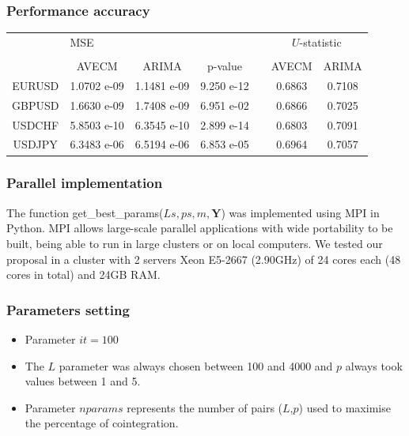 \documentclass[compress,red]{beamer}
\begin{document}
\begin{frame}
\frametitle{Performance accuracy}
\small
\begin{tabular}{ccccccc}
& \multicolumn{3}{l}{MSE} & &
\multicolumn{2}{c}{$U$-statistic} \\ 
\hhline{~---~--} \\
 & AVECM & ARIMA & p-value & &
AVECM & ARIMA \\ 

\hline
 EURUSD & 1.0702 e-09 & 1.1481 e-09 &  9.250 e-12 & & 0.6863 & 0.7108\\
 GBPUSD & 1.6630 e-09 & 1.7408 e-09 &  6.951 e-02 & & 0.6866 & 0.7025\\
 USDCHF & 5.8503 e-10 & 6.3545 e-10 &  2.899 e-14 & & 0.6803 & 0.7091\\
 USDJPY  & 6.3483 e-06 & 6.5194 e-06 &  6.853 e-05 & & 0.6964 & 0.7057
 \end{tabular}
 \end{frame}



\begin{frame}
\frametitle{Parallel implementation}
The function get\_best\_params($Ls,ps,m,\mathbf{Y}$) was implemented using MPI in Python. MPI allows large-scale parallel applications
with wide portability to be built, being able to run in large clusters
or on local computers.
We tested our proposal in a cluster with 2 servers Xeon E5-2667 (2.90GHz)
of 24 cores each (48 cores in total) and 24GB RAM.
\end{frame}

\begin{frame}
\frametitle{Parameters setting}
\begin{itemize}
\item Parameter $it=100$
\item The $L$ parameter was always chosen between 100 and 4000 and $p$ always took values
between 1 and 5. 
\item Parameter $nparams$ represents the number of pairs ($L$,$p$) used to maximise the percentage of cointegration. 
\end{itemize}
\end{frame}
\end{document}
